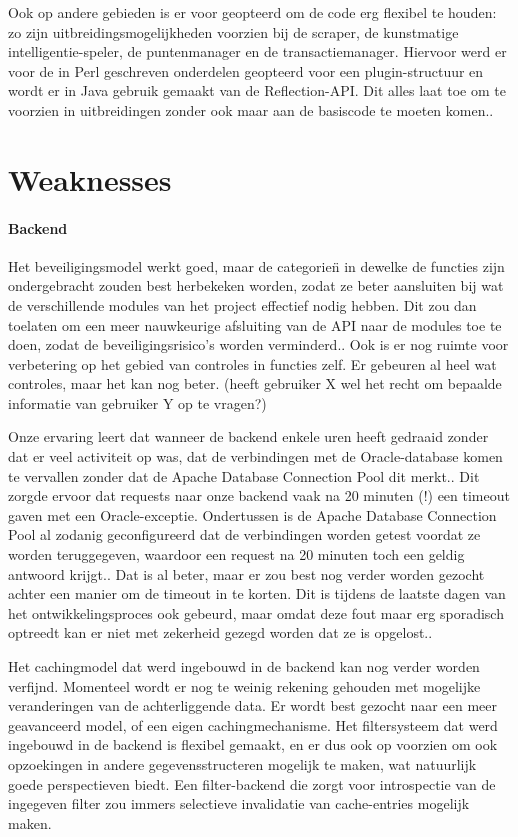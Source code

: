 Ook op andere gebieden is er voor geopteerd om de code erg flexibel te houden: zo zijn uitbreidingsmogelijkheden voorzien bij de scraper, de kunstmatige intelligentie-speler, de puntenmanager en de transactiemanager. Hiervoor werd er voor de in Perl geschreven onderdelen geopteerd voor een plugin-structuur en wordt er in Java gebruik gemaakt van de Reflection-API. Dit alles laat toe om te voorzien in uitbreidingen zonder ook maar aan de basiscode te moeten komen..

\section{Weaknesses}

\paragraph{Backend} Het beveiligingsmodel werkt goed, maar de categorie\"n in dewelke de functies zijn ondergebracht zouden best herbekeken worden, zodat ze beter aansluiten bij wat de verschillende modules van het project effectief nodig hebben. Dit zou dan toelaten om een meer nauwkeurige afsluiting van de API naar de modules toe te doen, zodat de beveiligingsrisico's worden verminderd.. Ook is er nog ruimte voor verbetering op het gebied van controles in functies zelf. Er gebeuren al heel wat controles, maar het kan nog beter. (heeft gebruiker X wel het recht om bepaalde informatie van gebruiker Y op te vragen?)

Onze ervaring leert dat wanneer de backend enkele uren heeft gedraaid zonder dat er veel activiteit op was, dat de verbindingen met de Oracle-database komen te vervallen zonder dat de Apache Database Connection Pool dit merkt.. Dit zorgde ervoor dat requests naar onze backend vaak na 20 minuten (!) een timeout gaven met een Oracle-exceptie. Ondertussen is de Apache Database Connection Pool al zodanig geconfigureerd dat de verbindingen worden getest voordat ze worden teruggegeven, waardoor een request na 20 minuten toch een geldig antwoord krijgt.. Dat is al beter, maar er zou best nog verder worden gezocht achter een manier om de timeout in te korten. Dit is tijdens de laatste dagen van het ontwikkelingsproces ook gebeurd, maar omdat deze fout maar erg sporadisch optreedt kan er niet met zekerheid gezegd worden dat ze is opgelost..

Het cachingmodel dat werd ingebouwd in de backend kan nog verder worden verfijnd. Momenteel wordt er nog te weinig rekening gehouden met mogelijke veranderingen van de achterliggende data. Er wordt best gezocht naar een meer geavanceerd model, of een eigen cachingmechanisme. Het filtersysteem dat werd ingebouwd in de backend is flexibel gemaakt, en er dus ook op voorzien om ook opzoekingen in andere gegevensstructeren mogelijk te maken, wat natuurlijk goede perspectieven biedt. Een filter-backend die zorgt voor introspectie van de ingegeven filter zou immers selectieve invalidatie van cache-entries mogelijk maken.

